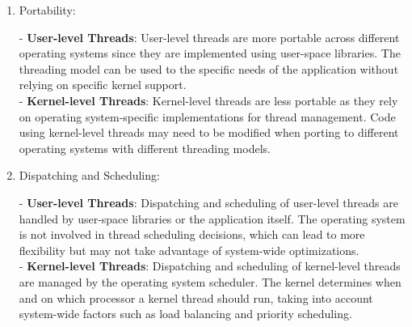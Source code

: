 \documentclass[a4paper,12pt,fleqn]{article}
\begin{document}
\begin{enumerate}
\item
{
Portability:
}
\begin{answer}
{
- \textbf{User-level Threads}: User-level threads are more portable across different operating systems since they are implemented using user-space libraries. The threading model can be used to the specific needs of the application without relying on specific kernel support.\\
- \textbf{Kernel-level Threads}: Kernel-level threads are less portable as they rely on operating system-specific implementations for thread management. Code using kernel-level threads may need to be modified when porting to different operating systems with different threading models.
}
\end{answer}

\item
{
Dispatching and Scheduling:
}
\begin{answer}
{
- \textbf{User-level Threads}: Dispatching and scheduling of user-level threads are handled by user-space libraries or the application itself. The operating system is not involved in thread scheduling decisions, which can lead to more flexibility but may not take advantage of system-wide optimizations.\\
- \textbf{Kernel-level Threads}: Dispatching and scheduling of kernel-level threads are managed by the operating system scheduler. The kernel determines when and on which processor a kernel thread should run, taking into account system-wide factors such as load balancing and priority scheduling.
}
\end{answer}

\end{enumerate}

\end{document}
